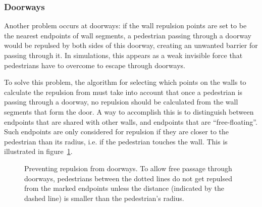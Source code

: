 \subsubsection{Doorways}
Another problem occurs at doorways: if the wall repulsion points are set to be 
the nearest endpoints of wall segments, a pedestrian passing through a doorway 
would be repulsed by both sides of this doorway, creating an unwanted barrier 
for passing through it. In simulations, this appears as a weak invisible force 
that pedestrians have to overcome to escape through doorways.

To solve this problem, the algorithm for selecting which points on the walls 
to calculate the repulsion from must take into account that once a pedestrian 
is passing through a doorway, no repulsion should be calculated from the wall 
segments that form the door. A way to accomplish this is to distinguish 
between endpoints that are shared with other walls, and endpoints that are 
``free-floating''. Such endpoints are only considered for repulsion if they 
are closer to the pedestrian than its radius, i.e. if the pedestrian touches 
the wall. This is illustrated in figure~\ref{fig:doorways}.

\begin{figure}[h]
    \centering

    \caption[Preventing repulsion from doorways]{Preventing repulsion from 
    doorways. To allow free passage through doorways, pedestrians between the 
    dotted lines do not get repulsed from the marked endpoints unless the 
    distance (indicated by the dashed line) is smaller than the pedestrian's 
    radius.}
    \label{fig:doorways}
\end{figure}

